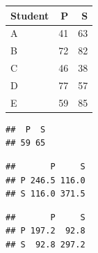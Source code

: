 \documentclass[]{book}
\newenvironment{Shaded}{\begin{snugshade}}{\end{snugshade}}
\newcommand{\DecValTok}[1]{\textcolor[rgb]{0.00,0.00,0.81}{#1}}
\newcommand{\KeywordTok}[1]{\textcolor[rgb]{0.13,0.29,0.53}{\textbf{#1}}}
\newcommand{\NormalTok}[1]{#1}
\newcommand{\OperatorTok}[1]{\textcolor[rgb]{0.81,0.36,0.00}{\textbf{#1}}}
\newcommand{\StringTok}[1]{\textcolor[rgb]{0.31,0.60,0.02}{#1}}
\theoremstyle{definition}
\theoremstyle{definition}
\theoremstyle{definition}
\theoremstyle{remark}
\begin{document}
\begin{table}[H]
\centering
\begin{tabular}{lrr}
\toprule
Student & P & S\\
\midrule
A & 41 & 63\\
B & 72 & 82\\
C & 46 & 38\\
D & 77 & 57\\
E & 59 & 85\\
\bottomrule
\end{tabular}
\end{table}

\begin{Shaded}
\end{Shaded}

\begin{verbatim}
##  P  S 
## 59 65
\end{verbatim}

\begin{Shaded}
\end{Shaded}

\begin{verbatim}
##       P     S
## P 246.5 116.0
## S 116.0 371.5
\end{verbatim}

\begin{Shaded}
\end{Shaded}

\begin{verbatim}
##       P     S
## P 197.2  92.8
## S  92.8 297.2
\end{verbatim}

\begin{Shaded}
\end{Shaded}
\end{document}
